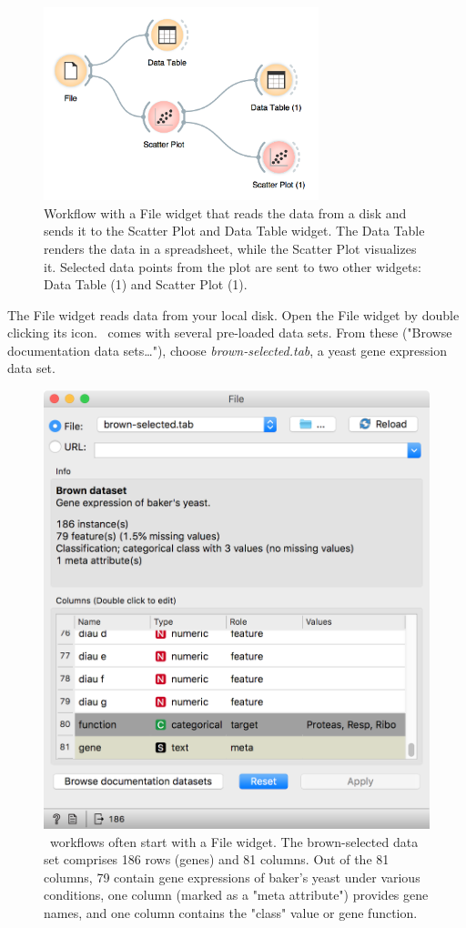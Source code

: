 \begin{figure}[h]
  \centering
  \includegraphics[width=80mm]{workflow-fig2.png}%
  \caption{Workflow with a File widget that reads the data from a disk and sends it to the Scatter Plot and Data Table widget. The Data Table renders the data in a spreadsheet, while the Scatter Plot visualizes it. Selected data points from the plot are sent to two other widgets: Data Table (1) and Scatter Plot (1).}
  \label{fig:workflow-fig2}
\end{figure}

The File widget reads data from your local disk. Open the File widget by double clicking its icon. \mutation\ comes with several pre-loaded data sets. From these ("Browse documentation data sets…"), choose \textit{brown-selected.tab}, a yeast gene expression data set.

\begin{figure}[h]
  \centering
  \includegraphics[width=0.9\linewidth]{file-brown.png}%
  \caption{\mutation\ workflows often start with a File widget. The brown-selected data set comprises 186 rows (genes) and 81 columns. Out of the 81 columns, 79 contain gene expressions of baker's yeast under various conditions, one column (marked as a "meta attribute") provides gene names, and one column contains the "class" value or gene function.}
  \label{fig:workflow-fig3}
\end{figure}

